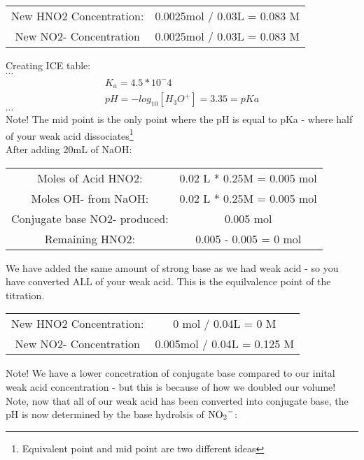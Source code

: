 \documentclass[../CHEM152Notes.tex]{subfiles}
\begin{document}
\begin{center}
    \begin{tabular}{ c c }
        New HNO2 Concentration: & 0.0025mol / 0.03L = 0.083 M \\
        New NO2- Concentration & 0.0025mol / 0.03L  = 0.083 M 
    \end{tabular}
\end{center}
Creating ICE table: \\
$\cdots$ %
\begin{equation*}
    \begin{aligned}
        K_a = 4.5 *10^-4 \\
        pH = -log_{10}[H_3O^+] = 3.35 = pKa
    \end{aligned}
\end{equation*}
$\cdots$  \\ %
Note! The mid point is the only point where the pH is equal to pKa - where half of your weak acid dissociates\footnote{Equivalent point and mid point are two different ideas} \\
After adding 20mL of NaOH:
\begin{center}
    \begin{tabular}{ c c }
    Moles of Acid HNO2: & 0.02 L * 0.25M = 0.005 mol \\
    Moles OH- from NaOH: & 0.02 L * 0.25M = 0.005 mol \\
    Conjugate base NO2- produced: & 0.005 mol \\
    Remaining HNO2: & 0.005 - 0.005 = 0 mol
    \end{tabular}    
\end{center}
We have added the same amount of strong base as we had weak acid - so you have converted ALL of your weak acid. This is the equilvalence point of the titration.
\begin{center}
    \begin{tabular}{ c c }
        New HNO2 Concentration: & 0 mol / 0.04L = 0 M \\
        New NO2- Concentration & 0.005mol / 0.04L  = 0.125 M 
    \end{tabular}
\end{center}
Note! We have a lower concetration of conjugate base compared to our inital weak acid concentration - but this is because of how we doubled our volume! \\
Note, now that all of our weak acid has been converted into conjugate base, the pH is now determined by the base hydrolsis of $\ce{NO2-}$: \\
\end{document}
